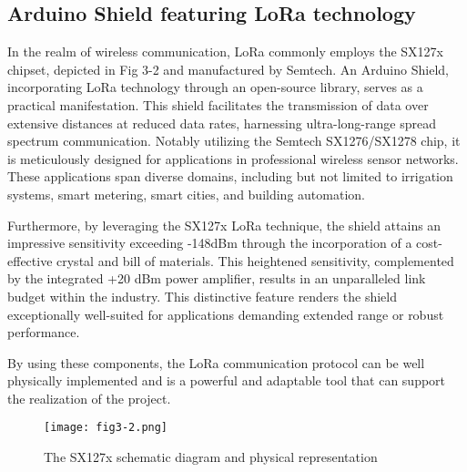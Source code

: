 \subsection{Arduino Shield featuring LoRa technology}
In the realm of wireless communication, LoRa commonly employs the SX127x chipset, depicted in Fig 3-2 and manufactured by Semtech. An Arduino Shield, incorporating LoRa technology through an open-source library, serves as a practical manifestation. This shield facilitates the transmission of data over extensive distances at reduced data rates, harnessing ultra-long-range spread spectrum communication. Notably utilizing the Semtech SX1276/SX1278 chip, it is meticulously designed for applications in professional wireless sensor networks. These applications span diverse domains, including but not limited to irrigation systems, smart metering, smart cities, and building automation.

Furthermore, by leveraging the SX127x LoRa technique, the shield attains an impressive sensitivity exceeding -148dBm through the incorporation of a cost-effective crystal and bill of materials. This heightened sensitivity, complemented by the integrated +20 dBm power amplifier, results in an unparalleled link budget within the industry. This distinctive feature renders the shield exceptionally well-suited for applications demanding extended range or robust performance.

By using these components, the LoRa communication protocol can be well physically implemented and is a powerful and adaptable tool that can support the realization of the project.
\begin{figure}
  \centering
  \texttt{[image: fig3-2.png]}
  \caption{The SX127x schematic diagram and physical representation}
  \label{fig:3-2}
\end{figure}

